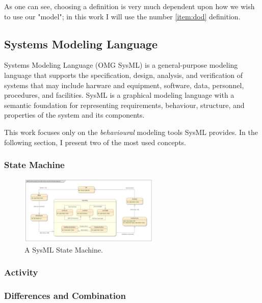 As one can see, choosing a definition is very much dependent upon how we wish to use our "model"; in this work I will use the number \ref{item:dod} definition.

\subsection{Systems Modeling Language}

Systems Modeling Language (OMG SysML)\cite{omg_sysml} is a general-purpose modeling language that supports the specification, design, analysis, and verification of systems that may include harware and equipment, software, data, personnel, procedures, and facilities. SysML is a graphical modeling language with a semantic foundation for representing requirements, behaviour, structure, and properties of the system and its components.\cite{sysml_practical_guide}

This work focuses only on the \emph{behavioural} modeling tools SysML provides. In the following section, I present two of the most used concepts.

\subsubsection{State Machine}



\begin{figure}[!ht]
	\centering
	\includegraphics[width=67mm, keepaspectratio]{figures/sysml_state_machine.png}\hspace{1cm}
	\caption{A SysML State Machine.}
	\label{fig:sysml_state_machine}
\end{figure}



\subsubsection{Activity}



\subsubsection{Differences and Combination}

